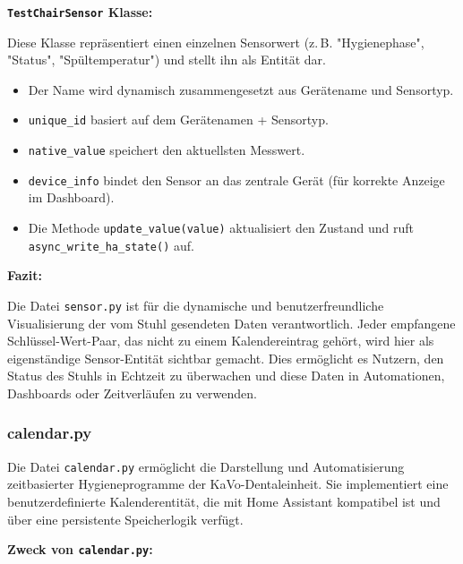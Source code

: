 \vspace{0.5cm}

\textbf{\texttt{TestChairSensor} Klasse:}

Diese Klasse repräsentiert einen einzelnen Sensorwert (z.\,B. "Hygienephase", "Status", "Spültemperatur") und stellt ihn als Entität dar.

\begin{itemize}
  \item Der Name wird dynamisch zusammengesetzt aus Gerätename und Sensortyp.\\
  \item \texttt{unique\_id} basiert auf dem Gerätenamen + Sensortyp.\\
  \item \texttt{native\_value} speichert den aktuellsten Messwert.\\
  \item \texttt{device\_info} bindet den Sensor an das zentrale Gerät (für korrekte Anzeige im Dashboard).\\
  \item Die Methode \texttt{update\_value(value)} aktualisiert den Zustand und ruft \texttt{async\_write\_ha\_state()} auf.
\end{itemize}

\vspace{0.5cm}

\textbf{Fazit:}

Die Datei \texttt{sensor.py} ist für die dynamische und benutzerfreundliche Visualisierung der vom Stuhl gesendeten Daten verantwortlich. Jeder empfangene Schlüssel-Wert-Paar, das nicht zu einem Kalendereintrag gehört, wird hier als eigenständige Sensor-Entität sichtbar gemacht. Dies ermöglicht es Nutzern, den Status des Stuhls in Echtzeit zu überwachen und diese Daten in Automationen, Dashboards oder Zeitverläufen zu verwenden.

\subsubsection{calendar.py}

Die Datei \texttt{calendar.py} ermöglicht die Darstellung und Automatisierung zeitbasierter Hygieneprogramme der KaVo-Dentaleinheit. Sie implementiert eine benutzerdefinierte Kalenderentität, die mit Home Assistant kompatibel ist und über eine persistente Speicherlogik verfügt.

\vspace{0.5cm}

\textbf{Zweck von \texttt{calendar.py}:}

